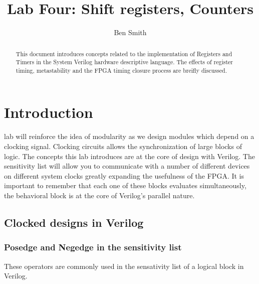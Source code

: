 
\title{Lab Four: Shift registers, Counters}
\author{Ben Smith}




  \maketitle
    \begin{abstract}
      This document introduces concepts related to the implementation of Registers and Timers in the System Verilog hardware descriptive language. The effects of register timing, metastability and the FPGA timing closure process are breifly discussed.
    \end{abstract}
\section{Introduction}
   lab will reinforce the idea of modularity as we design modules which depend on a clocking signal. Clocking circuits allows the synchronization of large blocks of logic. The concepts this lab introduces are at the core of design with Verilog. The sensitivity list will allow you to communicate with a number of different devices on different system clocks greatly expanding the usefulness of the FPGA. It is important to remember that each one of these blocks evaluates simultaneously, the behavioral block is at the core of Verilog's parallel nature. 

  \subsection{Clocked designs in Verilog}

    \subsubsection{Posedge and Negedge in the sensitivity list}
      These operators are commonly used in the sensativity list of a logical block in Verilog.
    

